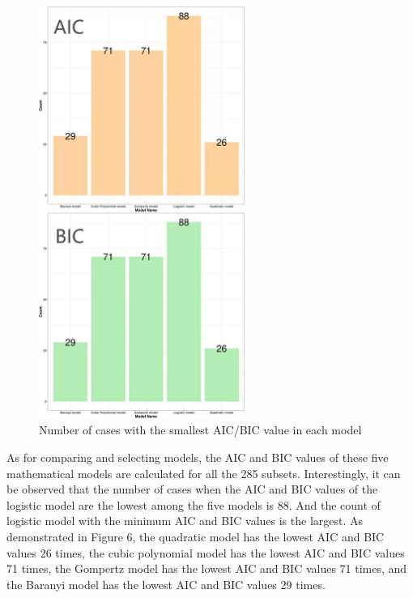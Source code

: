 \documentclass[11pt, a4paper]{article}
\begin{document}
\begin{figure}[H]
    \centering
    \includegraphics[width=0.6\textwidth]{figure6}
    \caption{Number of cases with the smallest AIC/BIC value in each model}
    \label{figure6}
\end{figure}
As for comparing and selecting models, the AIC and BIC values of these five mathematical models are calculated for all the 285 subsets. Interestingly, it can be observed that the number of cases when the AIC and BIC values of the logistic model are the lowest among the five models is 88. And the count of logistic model with the minimum AIC and BIC values is the largest. As demonstrated in Figure 6, the quadratic model has the lowest AIC and BIC values 26 times, the cubic polynomial model has the lowest AIC and BIC values 71 times, the Gompertz model has the lowest AIC and BIC values 71 times, and the Baranyi model has the lowest AIC and BIC values 29 times. 
\end{document}
